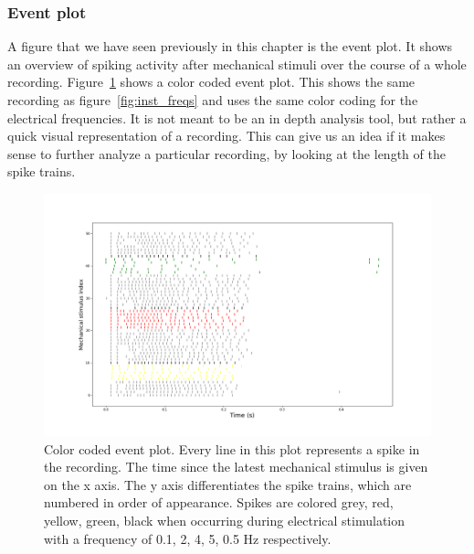 \subsubsection{Event plot}
A figure that we have seen previously in this chapter is the event plot. It shows an overview of spiking activity after mechanical stimuli over the course of a whole recording. Figure~\ref{fig:event_color} shows a color coded event plot. This shows the same recording as figure~\ref{fig:inst_freqs} and uses the same color coding for the electrical frequencies. It is not meant to be an in depth analysis tool, but rather a quick visual representation of a recording. This can give us an idea if it makes sense to further analyze a particular recording, by looking at the length of the spike trains.

\begin{figure}
	\includegraphics[width = \textwidth]{src/pic/11_12_13U1bevent_color}
	\caption{Color coded event plot. Every line in this plot represents a spike in the recording. The time since the latest mechanical stimulus is given on the x axis. The y axis differentiates the spike trains, which are numbered in order of appearance. Spikes are colored grey, red, yellow, green, black when occurring during electrical stimulation with a frequency of 0.1, 2, 4, 5, 0.5 Hz respectively.}
	\label{fig:event_color}
\end{figure}







\cleardoublepage
